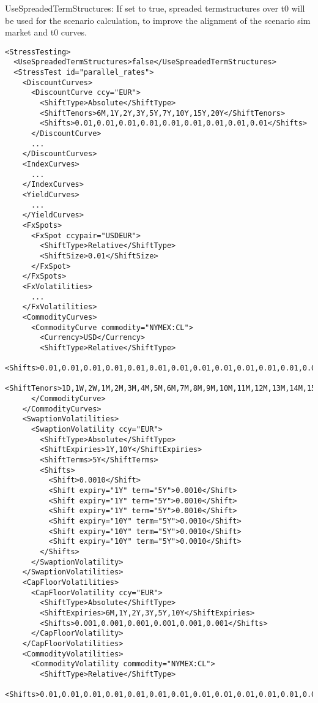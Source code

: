 UseSpreadedTermStructures: If set to true, spreaded termstructures over t0 will be used for the scenario calculation, to
improve the alignment of the scenario sim market and t0 curves.

\begin{longlisting}
  \begin{verbatim}
<StressTesting>
  <UseSpreadedTermStructures>false</UseSpreadedTermStructures>
  <StressTest id="parallel_rates">
    <DiscountCurves>
      <DiscountCurve ccy="EUR">
        <ShiftType>Absolute</ShiftType>
        <ShiftTenors>6M,1Y,2Y,3Y,5Y,7Y,10Y,15Y,20Y</ShiftTenors>
        <Shifts>0.01,0.01,0.01,0.01,0.01,0.01,0.01,0.01,0.01</Shifts>
      </DiscountCurve>
      ...
    </DiscountCurves>
    <IndexCurves>
      ...
    </IndexCurves>
    <YieldCurves>
      ...
    </YieldCurves>
    <FxSpots>
      <FxSpot ccypair="USDEUR">
        <ShiftType>Relative</ShiftType>
        <ShiftSize>0.01</ShiftSize>
      </FxSpot>
    </FxSpots>
    <FxVolatilities>
      ...
    </FxVolatilities>
    <CommodityCurves>
      <CommodityCurve commodity="NYMEX:CL">
        <Currency>USD</Currency>
        <ShiftType>Relative</ShiftType>
        <Shifts>0.01,0.01,0.01,0.01,0.01,0.01,0.01,0.01,0.01,0.01,0.01,0.01,0.01,0.01,0.01,0.01,0.01,0.01,0.01,0.01,0.01,0.01,0.01,0.01,0.01,0.01,0.01</Shifts>
        <ShiftTenors>1D,1W,2W,1M,2M,3M,4M,5M,6M,7M,8M,9M,10M,11M,12M,13M,14M,15M,16M,17M,18M,19M,20M,21M,22M,23M,24M</ShiftTenors>
      </CommodityCurve>
    </CommodityCurves>
    <SwaptionVolatilities>
      <SwaptionVolatility ccy="EUR">
        <ShiftType>Absolute</ShiftType>
        <ShiftExpiries>1Y,10Y</ShiftExpiries>
        <ShiftTerms>5Y</ShiftTerms>
        <Shifts>
          <Shift>0.0010</Shift>
          <Shift expiry="1Y" term="5Y">0.0010</Shift>
          <Shift expiry="1Y" term="5Y">0.0010</Shift>
          <Shift expiry="1Y" term="5Y">0.0010</Shift>
          <Shift expiry="10Y" term="5Y">0.0010</Shift>
          <Shift expiry="10Y" term="5Y">0.0010</Shift>
          <Shift expiry="10Y" term="5Y">0.0010</Shift>
        </Shifts>
      </SwaptionVolatility>
    </SwaptionVolatilities>
    <CapFloorVolatilities>
      <CapFloorVolatility ccy="EUR">
        <ShiftType>Absolute</ShiftType>
        <ShiftExpiries>6M,1Y,2Y,3Y,5Y,10Y</ShiftExpiries>
        <Shifts>0.001,0.001,0.001,0.001,0.001,0.001</Shifts>
      </CapFloorVolatility>
    </CapFloorVolatilities>
    <CommodityVolatilities>
      <CommodityVolatility commodity="NYMEX:CL">
        <ShiftType>Relative</ShiftType>
        <Shifts>0.01,0.01,0.01,0.01,0.01,0.01,0.01,0.01,0.01,0.01,0.01,0.01,0.01,0.01,0.01</Shifts>

\end{verbatim}
\end{longlisting}
